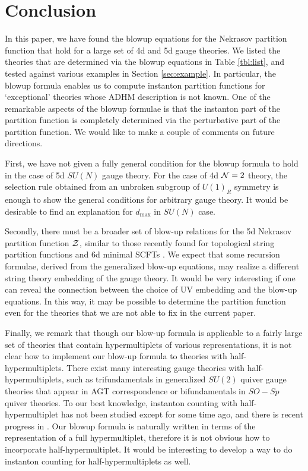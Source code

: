 \documentclass[letterpaper, 11pt]{article}
\def\CN{{\cal N}}
\def\CZ{{\cal Z}}
\begin{document}
{\section{Conclusion} \label{sec:conclusion}

In this paper, we have found the blowup equations for the Nekrasov partition function that hold for a large set of 4d and 5d gauge theories. 
We listed the theories that are determined via the blowup equations in Table \ref{tbl:list}, and tested against various examples in Section \ref{sec:example}. In particular, the blowup formula enables us to compute instanton partition functions for `exceptional' theories whose ADHM description is not known. 
One of the remarkable aspects of the blowup formulae is that the instanton part of the partition function is completely determined via the perturbative part of the partition function. We would like to make a couple of comments on future directions. 

First, we have not given a fully general condition for the blowup formula to hold in the case of 5d $SU(N)$ gauge theory. For the case of 4d $\CN=2$ theory, the selection rule obtained from an unbroken subgroup of $U(1)_R$ symmetry is enough to show the general conditions for arbitrary gauge theory. It would be desirable to find an explanation  for $d_{\text{max}}$ in $SU(N)$ case. 

Secondly, there must be a broader set of blow-up relations for the 5d Nekrasov partition function $\CZ$, similar to those recently found for topological string partition functions and 6d minimal SCFTs \cite{Grassi:2016nnt, Gu:2017ccq, Huang:2017mis, Gu:2018gmy,Gu:2019dan}. We expect that some recursion formulae, derived from the generalized blow-up equations, may realize a different string theory embedding of the gauge theory. It would be very interesting if one can reveal the connection between the choice of UV embedding and the blow-up equations. In this way, it may be possible to determine the partition function even for the theories that we are not able to fix in the current paper. 

Finally, we remark that though our blow-up formula is applicable to a fairly large set of theories that contain hypermultiplets of various representations, it is not clear how to implement our blow-up formula to theories with half-hypermultiplets.  There exist many interesting gauge theories with half-hypermultiplets, such as trifundamentals in generalized $SU(2)$ quiver gauge theories \cite{Gaiotto:2009we} that appear in AGT correspondence \cite{Alday:2009aq} or bifundamentals in $SO-Sp$ quiver theories. To our best knowledge, instanton counting with half-hypermultiplet has not been studied except for \cite{Hollands:2010xa, Hollands:2011zc} some time ago, and there is recent progress in \cite{Coman:2019eex}. Our blowup formula is naturally written in terms of the representation of a full hypermultiplet, therefore it is not obvious how to incorporate half-hypermultiplet. It would be interesting to develop a way to do instanton counting for  half-hypermultiplets as well. 


}
\end{document}
